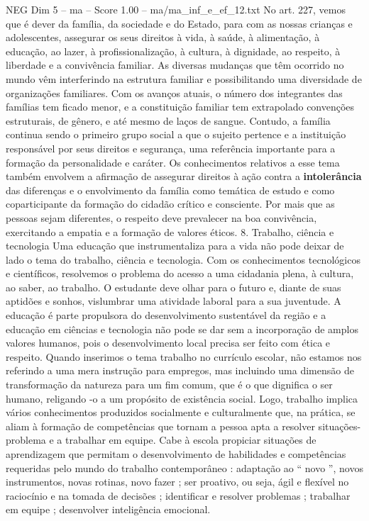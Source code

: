 \begin{textsample}{NEG Dim 5 – ma – Score 1.00 – ma/ma\_inf\_e\_ef\_12.txt}
No art. 227, vemos que é dever da família, da sociedade e do Estado, para com as nossas crianças e adolescentes, assegurar os seus direitos à vida, à saúde, à alimentação, à educação, ao lazer, à profissionalização, à cultura, à dignidade, ao respeito, à liberdade e a convivência familiar.
As diversas mudanças que têm ocorrido no mundo vêm interferindo na estrutura familiar e possibilitando uma diversidade de organizações familiares.
Com os avanços atuais, o número dos integrantes das famílias tem ficado menor, e a constituição familiar tem extrapolado convenções estruturais, de gênero, e até mesmo de laços de sangue.
Contudo, a família continua sendo o primeiro grupo social a que o sujeito pertence e a instituição responsável por seus direitos e segurança, uma referência importante para a formação da personalidade e caráter.
Os conhecimentos relativos a esse tema também envolvem a afirmação de assegurar direitos à ação contra a \textbf{intolerância} das diferenças e o envolvimento da família como temática de estudo e como coparticipante da formação do cidadão crítico e consciente.
Por mais que as pessoas sejam diferentes, o respeito deve prevalecer na boa convivência, exercitando a empatia e a formação de valores éticos. 8.
Trabalho, ciência e tecnologia Uma educação que instrumentaliza para a vida não pode deixar de lado o tema do trabalho, ciência e tecnologia.
Com os conhecimentos tecnológicos e científicos, resolvemos o problema do acesso a uma cidadania plena, à cultura, ao saber, ao trabalho.
O estudante deve olhar para o futuro e, diante de suas aptidões e sonhos, vislumbrar uma atividade laboral para a sua juventude.
A educação é parte propulsora do desenvolvimento sustentável da região e a educação em ciências e tecnologia não pode se dar sem a incorporação de amplos valores humanos, pois o desenvolvimento local precisa ser feito com ética e respeito.
Quando inserimos o tema trabalho no currículo escolar, não estamos nos referindo a uma mera instrução para empregos, mas incluindo uma dimensão de transformação da natureza para um fim comum, que é o que dignifica o ser humano, religando -o a um propósito de existência social.
Logo, trabalho implica vários conhecimentos produzidos socialmente e culturalmente que, na prática, se aliam à formação de competências que tornam a pessoa apta a resolver situações-problema e a trabalhar em equipe.
Cabe à escola propiciar situações de aprendizagem que permitam o desenvolvimento de habilidades e competências requeridas pelo mundo do trabalho contemporâneo : adaptação ao “ novo ”, novos instrumentos, novas rotinas, novo fazer ; ser proativo, ou seja, ágil e flexível no raciocínio e na tomada de decisões ; identificar e resolver problemas ; trabalhar em equipe ; desenvolver inteligência emocional.

\end{textsample}
